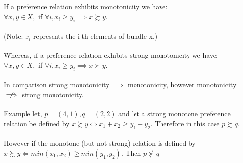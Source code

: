 \documentclass[12pt]{article}
\newenvironment{problem}[2][Problem]{\begin{trivlist}
\item[\hskip \labelsep {\bfseries #1}\hskip \labelsep {\bfseries #2.}]}{\end{trivlist}}
\begin{document}
\begin{problem}{3}. 
\\
\\
If a preference relation exhibits monotonicity we have: \\ $\forall x, y \in X,$ if $ \forall i, x_i \geq y_i \implies x \succsim y.$
\\
\\
(Note: $x_i $ represents the i-th elements of bundle x.) 
\\
\\
Whereas, if a preference relation exhibits strong monotonicity we have: \\ $\forall x, y \in X,$ if $ \forall i, x_i \geq y_i \implies x \succ y.$
\\
\\
In comparison strong monotonicity $ \implies $ monotonicity, however monotonicity $ \centernot \implies $ strong monotonicity.
\\
\\
Example let, $p = (4,1), q = (2,2) $ and let a strong monotone preference relation be defined by $x\succsim y \iff x_1 + x_2 \geq y_1 + y_2. $ Therefore in this case $p \succsim q. $ \\ \\
However if the monotone (but not strong) relation is defined by $x \succsim y \iff min(x_1 , x_2) \geq min(y_1, y_2). $ Then $ p \nsucc q $
\end{problem}
\end{document}
